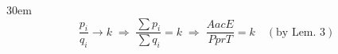 \documentclass[border=4pt]{standalone}
\begin{document}
\begin{varwidth}{30em}
\large
\[ \frac{p_i}{q_i} \to k \;\Longrightarrow\; \frac{\sum p_i}{\sum q_i} = k \;\Longrightarrow\; \frac{AacE}{PprT} = k \quad (\text{by Lem. 3}) \]

\end{varwidth}
\end{document}
